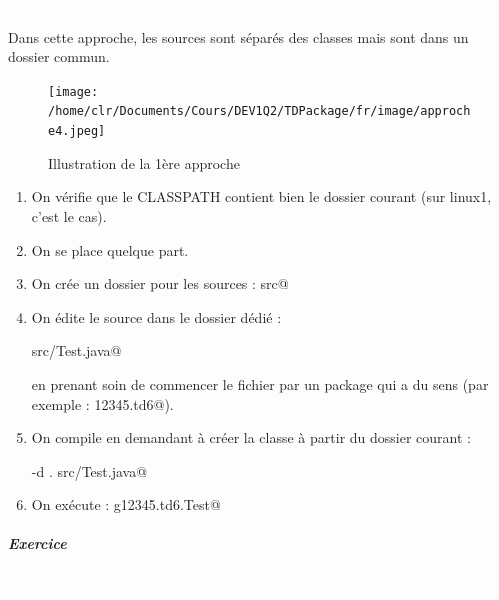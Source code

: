 \documentclass[11pt,a4paper]{article}
\begin{document}
					\textcolor{white}{.} \par
				
            \par
        
				Dans cette approche, les sources sont s\'epar\'es des classes
				mais sont dans un dossier commun.
			
            \par
        \begin{figure}[hbt]
				    \begin{center}
					\texttt{[image: /home/clr/Documents/Cours/DEV1Q2/TDPackage/fr/image/approche4.jpeg]}
						\end{center}
                
                    \caption[Illustration de la 1\`ere approche]{Illustration de la 1\`ere approche}
                \end{figure}
                    
					\begin{enumerate}
				
			\item 
					On v\'erifie que le CLASSPATH contient bien le 
					dossier courant (sur linux1, c'est le cas).
				
			\item 
					On se place quelque part.
				
			\item 
					On cr\'ee un dossier pour les sources : \verb@mkdir src@
			\item 
					On \'edite le source dans le dossier d\'edi\'e : 
					\par
				\verb@nano src/Test.java@\par
				
					en prenant soin de commencer le fichier par un package qui a du sens
					(par exemple : \verb@g12345.td6@).
				
			\item 
					On compile en demandant \`a cr\'eer la classe \`a partir
					du dossier courant : 
					\par
				\verb@javac -d . src/Test.java@
			\item 
					On ex\'ecute : \verb@java g12345.td6.Test@
					\end{enumerate}
				
			
		\subparagraph{Exercice} 
		
					\textcolor{white}{.} \par
				
            \par
        
\end{document}

